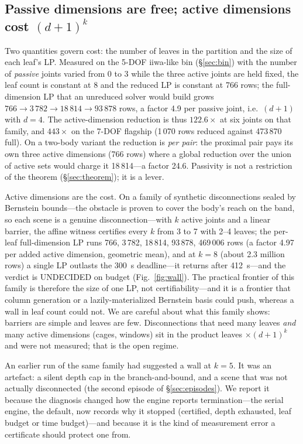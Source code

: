 \documentclass[10pt,twocolumn,letterpaper]{article}
\begin{document}
\subsection{Passive dimensions are free; active dimensions cost \texorpdfstring{$(d+1)^k$}{(d+1)\^{}k}}\label{sec:costmodel}
Two quantities govern cost: the number of leaves in the partition and the size of each leaf's LP. Measured on the 5-DOF iiwa-like bin (\S\ref{sec:bin}) with the number of \emph{passive} joints varied from 0 to 3 while the three active joints are held fixed, the leaf count is constant at 8 and the reduced LP is constant at 766 rows; the full-dimension LP that an unreduced solver would build grows $766\to3\,782\to18\,814\to93\,878$ rows, a factor 4.9 per passive joint, i.e.\ $(d+1)$ with $d=4$. The active-dimension reduction is thus $122.6\times$ at six joints on that family, and $443\times$ on the 7-DOF flagship (1\,070 rows reduced against 473\,870 full). On a two-body variant the reduction is \emph{per pair}: the proximal pair pays its own three active dimensions (766 rows) where a global reduction over the union of active sets would charge it 18\,814---a factor 24.6. Passivity is not a restriction of the theorem (\S\ref{sec:theorem}); it is a lever.

Active dimensions are the cost. On a family of synthetic disconnections sealed by Bernstein bounds---the obstacle is proven to cover the body's reach on the band, so each scene is a genuine disconnection---with $k$ active joints and a linear barrier, the affine witness certifies every $k$ from 3 to 7 with 2--4 leaves; the per-leaf full-dimension LP runs 766, 3\,782, 18\,814, 93\,878, 469\,006 rows (a factor 4.97 per added active dimension, geometric mean), and at $k=8$ (about 2.3 million rows) a single LP outlasts the 300~s deadline---it returns after 412~s---and the verdict is UNDECIDED on budget (Fig.~\ref{fig:wall}). The practical frontier of this family is therefore the size of one LP, not certifiability---and it is a frontier that column generation or a lazily-materialized Bernstein basis could push, whereas a wall in leaf count could not. We are careful about what this family shows: barriers are simple and leaves are few. Disconnections that need many leaves \emph{and} many active dimensions (cages, windows) sit in the product leaves $\times(d+1)^k$ and were not measured; that is the open regime.

An earlier run of the same family had suggested a wall at $k=5$. It was an artefact: a silent depth cap in the branch-and-bound, and a scene that was not actually disconnected (the second episode of \S\ref{sec:episodes}). We report it because the diagnosis changed how the engine reports termination---the serial engine, the default, now records why it stopped (certified, depth exhausted, leaf budget or time budget)---and because it is the kind of measurement error a certificate should protect one from.
\end{document}
